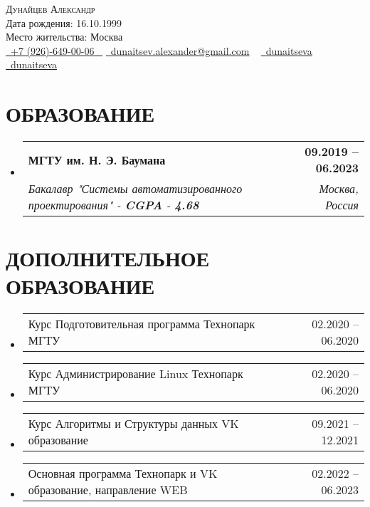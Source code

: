 \documentclass[letterpaper,11pt]{article}
\makeatletter
\newcommand{\resumeSubheading}[4]{
  \vspace{-2pt}\item
    \begin{tabular*}{1.0\textwidth}[t]{l@{\extracolsep{\fill}}r}
      \textbf{\large#1} & \textbf{\small #2} \\
      \textit{\large#3} & \textit{\small #4} \\
      
    \end{tabular*}\vspace{-7pt}
}
\newcommand{\resumeSubheadingAdditional}[2]{
	\vspace{-2pt}\item
	\begin{tabular*}{1.0\textwidth}[t]{l@{\extracolsep{\fill}}r}
		\large#1 & \small #2 \\
		
	\end{tabular*}\vspace{-7pt}
}
\newcommand{\resumeSubHeadingListStart}{\begin{itemize}[leftmargin=0.0in, label={}]}
\newcommand{\resumeSubHeadingListEnd}{\end{itemize}}
\makeatother
\begin{document}


\begin{center}
    {\Huge \scshape Дунайцев Александр} \\ \vspace{1pt}
    Дата рождения: 16.10.1999 \\  Место жительства: Москва \\ \vspace{1pt}
    \small \href{tel:+79266490006}{ \raisebox{-0.1\height}\faPhone\ \underline{+7 (926)-649-00-06} ~} \href{dunaitsev.alexander@gmail.com}{\raisebox{-0.2\height}\faEnvelope\  \underline{dunaitsev.alexander@gmail.com}} ~ 
    \href{https://github.com/dunaitseva}{\raisebox{-0.2\height}\faGithub\ \underline{dunaitseva}} ~
    \href{https://t.me/dunaitseva}{\raisebox{-0.2\height}\faTelegram\ \underline{dunaitseva}} ~
    \vspace{-8pt}
\end{center}


\section{ОБРАЗОВАНИЕ}
  \resumeSubHeadingListStart
  \resumeSubheading
  {МГТУ им. Н. Э. Баумана}{09.2019 -- 06.2023}
  {Бакалавр "Системы автоматизированного проектирования" - \textbf{CGPA} - \textbf{4.68}}{Москва, Россия}
  \resumeSubHeadingListEnd

\section{ДОПОЛНИТЕЛЬНОЕ ОБРАЗОВАНИЕ}
\resumeSubHeadingListStart
\resumeSubheadingAdditional
{Курс Подготовительная программа Технопарк МГТУ}{02.2020 -- 06.2020}
\resumeSubHeadingListEnd

\resumeSubHeadingListStart
\resumeSubheadingAdditional
{Курс Администрирование Linux Технопарк МГТУ}{02.2020 -- 06.2020}
\resumeSubHeadingListEnd

\resumeSubHeadingListStart
\resumeSubheadingAdditional
{Курс Алгоритмы и Структуры данных VK образование}{09.2021 -- 12.2021}
\resumeSubHeadingListEnd

\resumeSubHeadingListStart
\resumeSubheadingAdditional
{Основная программа Технопарк и VK образование, направление WEB}{02.2022 -- 06.2023}
\resumeSubHeadingListEnd
\end{document}

